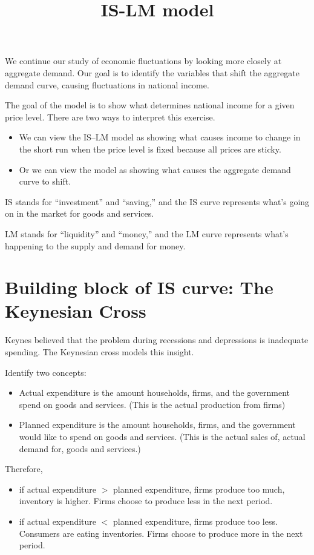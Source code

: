 \documentclass[10pt]{article}
\title{IS-LM model}
\author{}
\date{}
\begin{document}
\maketitle



We continue our study of economic fluctuations by looking more closely at aggregate demand. Our goal is to identify the variables that shift the aggregate demand curve, causing fluctuations in national income.

The goal of the model is to show what determines national income for a given price level. There are two ways to interpret this exercise.
\begin{itemize}
\item We can view the IS–LM model as showing what causes income to change in the short run when the price level is fixed because all prices are sticky.
\item Or we can view the model as showing what causes the aggregate demand curve to shift.
\end{itemize}
 


IS stands for “investment” and “saving,” and the IS curve represents what’s going on in the market for goods and services.

LM stands for “liquidity” and “money,” and the LM curve represents what’s happening to the supply and demand for money. 



\section{Building block of IS curve: The Keynesian Cross}
Keynes believed that the problem during recessions and depressions is inadequate spending. The Keynesian cross models this insight.

Identify two concepts:
\begin{itemize}
\item Actual expenditure is the amount households, firms, and the government spend on goods and services. (This is the actual production from firms)
\item Planned expenditure is the amount households, firms, and the government would like to spend on goods and services. (This is the actual sales of, actual demand for,  goods and services.)
\end{itemize}


Therefore, 
\begin{itemize}
\item if actual expenditure $ > $ planned expenditure, firms produce too much, inventory
		is higher. Firms choose to produce less in the next period.
\item if actual expenditure $ < $ planned expenditure, firms produce too less. Consumers
		are eating inventories. Firms choose to produce more in the next period.
\end{itemize}
\end{document}
